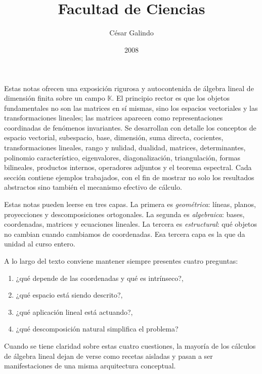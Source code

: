 \documentclass[10pt,a4paper,oneside]{article}
\title{\vspace{-1.5em}{\Huge\bfseries\color{ihesblue} Mis notas de Lineal}\\[0.4em]{\large Facultad de Ciencias}}
\author{\Large César Galindo}
\date{2008}
\theoremstyle{plain}
\theoremstyle{definition}
\theoremstyle{remark}
\newcommand{\K}{\mathbb{K}}
\begin{document}
\maketitle
\thispagestyle{empty}

\tableofcontents
\bigskip


Estas notas ofrecen una exposición rigurosa y autocontenida de álgebra lineal de dimensión finita sobre un campo \(\K\). El principio rector es que los objetos fundamentales no son las matrices en sí mismas, sino los espacios vectoriales y las transformaciones lineales; las matrices aparecen como representaciones coordinadas de fenómenos invariantes. Se desarrollan con detalle los conceptos de espacio vectorial, subespacio, base, dimensión, suma directa, cocientes, transformaciones lineales, rango y nulidad, dualidad, matrices, determinantes, polinomio característico, eigenvalores, diagonalización, triangulación, formas bilineales, productos internos, operadores adjuntos y el teorema espectral. Cada sección contiene ejemplos trabajados, con el fin de mostrar no solo los resultados abstractos sino también el mecanismo efectivo de cálculo.

\begin{ideaBox}
Estas notas pueden leerse en tres capas. La primera es \emph{geométrica}: líneas, planos, proyecciones y descomposiciones ortogonales. La segunda es \emph{algebraica}: bases, coordenadas, matrices y ecuaciones lineales. La tercera es \emph{estructural}: qué objetos no cambian cuando cambiamos de coordenadas. Esa tercera capa es la que da unidad al curso entero.
\end{ideaBox}

\begin{summaryBox}
A lo largo del texto conviene mantener siempre presentes cuatro preguntas:
\begin{enumerate}[label=\textup{(\arabic*)}]
\item ¿qué depende de las coordenadas y qué es intrínseco?,
\item ¿qué espacio está siendo descrito?,
\item ¿qué aplicación lineal está actuando?,
\item ¿qué descomposición natural simplifica el problema?
\end{enumerate}
Cuando se tiene claridad sobre estas cuatro cuestiones, la mayoría de los cálculos de álgebra lineal dejan de verse como recetas aisladas y pasan a ser manifestaciones de una misma arquitectura conceptual.
\end{summaryBox}
\end{document}
